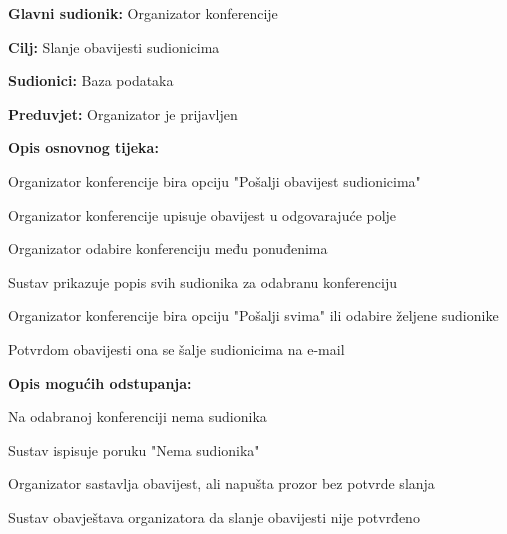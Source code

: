	\noindent {}
	\begin{packed_item}
		
		\item \textbf{Glavni sudionik: }Organizator konferencije
		\item  \textbf{Cilj:} Slanje obavijesti sudionicima
		\item  \textbf{Sudionici:} Baza podataka
		\item  \textbf{Preduvjet:} Organizator je prijavljen
		\item  \textbf{Opis osnovnog tijeka:}
		
		\item[] \begin{packed_enum}
			
			\item Organizator konferencije bira opciju "Pošalji obavijest sudionicima"
			\item Organizator konferencije upisuje obavijest u odgovarajuće polje
			\item Organizator odabire konferenciju među ponuđenima
			\item Sustav prikazuje popis svih sudionika za odabranu konferenciju
			\item Organizator konferencije bira opciju "Pošalji svima" ili odabire željene sudionike
			\item Potvrdom obavijesti ona se šalje sudionicima na e-mail
			
		\end{packed_enum}
		
		\item  \textbf{Opis mogućih odstupanja:}
		
		\item[] \begin{packed_item}
			
			\item[4.a] Na odabranoj konferenciji nema sudionika
			\item[] \begin{packed_enum}
				\item Sustav ispisuje poruku "Nema sudionika"
				
			\end{packed_enum}
			\item[6.a] Organizator sastavlja obavijest, ali napušta prozor bez potvrde slanja
			\item[] \begin{packed_enum}
				\item Sustav obavještava organizatora da slanje obavijesti nije potvrđeno
				
			\end{packed_enum}
		\end{packed_item}
	\end{packed_item}

